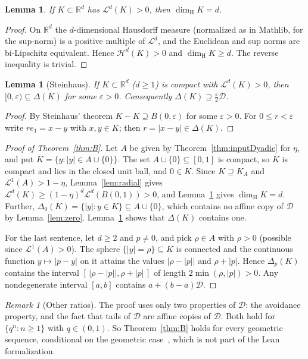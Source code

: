 \documentclass[11pt]{amsart}
\newtheorem{lemma}[theorem]{Lemma}
\theoremstyle{definition}
\theoremstyle{remark}
\newtheorem{remark}[theorem]{Remark}
\newcommand{\R}{\mathbb{R}}
\newcommand{\dimH}{\dim_{\mathrm H}}
\newcommand{\Lm}{\mathcal{L}}
\newcommand{\Dy}{\mathcal{D}}
\begin{document}
\begin{lemma}\label{lem:dim}
If $K\subset\R^d$ has $\Lm^d(K)>0$, then $\dimH K=d$.
\end{lemma}

\begin{proof}
On $\R^d$ the $d$-dimensional Hausdorff measure (normalized as in Mathlib, for the sup-norm) is a
positive multiple of $\Lm^d$, and the Euclidean and sup norms are bi-Lipschitz equivalent.
Hence $\mathcal H^d(K)>0$ and $\dimH K\ge d$. The reverse inequality is trivial.
\end{proof}

\begin{lemma}[Steinhaus]\label{lem:interval}
If $K\subset\R^d$ ($d\ge1$) is compact with $\Lm^d(K)>0$, then $[0,\varepsilon)\subseteq\Delta(K)$
for some $\varepsilon>0$. Consequently $\Delta(K)\supseteq\frac\varepsilon2\Dy$.
\end{lemma}

\begin{proof}
By Steinhaus' theorem $K-K\supseteq B(0,\varepsilon)$ for some $\varepsilon>0$. For
$0\le r<\varepsilon$ write $re_1=x-y$ with $x,y\in K$; then $r=|x-y|\in\Delta(K)$.
\end{proof}

\begin{proof}[Proof of Theorem~\ref{thm:B}]
Let $A$ be given by Theorem~\ref{thm:inputDyadic} for $\eta$, and put $K=\{y:|y|\in A\cup\{0\}\}$. The set
$A\cup\{0\}\subseteq[0,1]$ is compact, so $K$ is compact and lies in the closed unit ball, and
$0\in K$. Since $K\supseteq K_A$ and $\Lm^1(A)>1-\eta$, Lemma~\ref{lem:radial} gives
$\Lm^d(K)\ge(1-\eta)^d\Lm^d(B(0,1))>0$, and Lemma~\ref{lem:dim} gives $\dimH K=d$. Further,
$\Delta_0(K)=\{|y|:y\in K\}\subseteq A\cup\{0\}$, which contains no affine copy of $\Dy$ by
Lemma~\ref{lem:zero}. Lemma~\ref{lem:interval} shows that $\Delta(K)$ contains one.

For the last sentence, let $d\ge2$ and $p\ne0$, and pick $\rho\in A$ with $\rho>0$ (possible since
$\Lm^1(A)>0$). The sphere $\{|y|=\rho\}\subseteq K$ is connected and the continuous function
$y\mapsto|p-y|$ on it attains the values $|\rho-|p||$ and $\rho+|p|$. Hence $\Delta_p(K)$ contains
the interval $[\,|\rho-|p||,\rho+|p|\,]$ of length $2\min(\rho,|p|)>0$. Any nondegenerate interval
$[a,b]$ contains $a+(b-a)\Dy$.
\end{proof}

\begin{remark}[Other ratios]
The proof uses only two properties of $\Dy$: the avoidance property, and the fact that tails of $\Dy$
are affine copies of $\Dy$. Both hold for $\{q^n:n\ge1\}$ with $q\in(0,1)$. So Theorem~\ref{thm:B}
holds for every geometric sequence, conditional on the geometric case~\cite{OAIGeometric}, which is
not part of the Lean formalization.
\end{remark}
\end{document}
